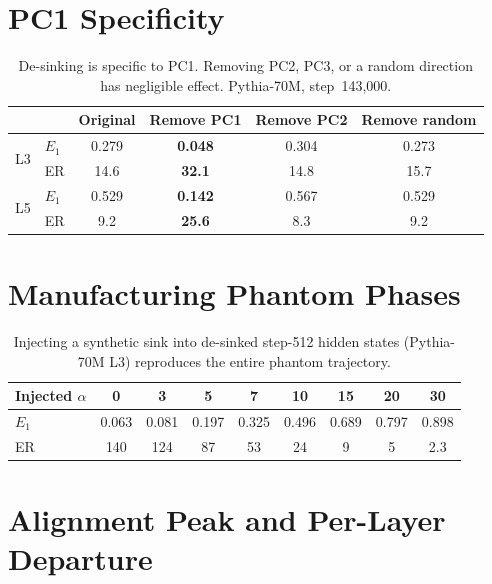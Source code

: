 \documentclass[11pt]{article}
\begin{document}
\section{PC1 Specificity}\label{app:specificity}

\begin{table}[h]
\centering
\caption{De-sinking is specific to PC1. Removing PC2, PC3, or a random direction has negligible effect. Pythia-70M, step~143{,}000.}
\small
\begin{tabular}{@{}llcccc@{}}
\toprule
& & \textbf{Original} & \textbf{Remove PC1} & \textbf{Remove PC2} & \textbf{Remove random} \\
\midrule
\multirow{2}{*}{L3} & $E_1$ & 0.279 & \textbf{0.048} & 0.304 & 0.273 \\
& ER & 14.6 & \textbf{32.1} & 14.8 & 15.7 \\
\midrule
\multirow{2}{*}{L5} & $E_1$ & 0.529 & \textbf{0.142} & 0.567 & 0.529 \\
& ER & 9.2 & \textbf{25.6} & 8.3 & 9.2 \\
\bottomrule
\end{tabular}
\end{table}

\section{Manufacturing Phantom Phases}\label{app:manufacture}

\begin{table}[h]
\centering
\caption{Injecting a synthetic sink into de-sinked step-512 hidden states (Pythia-70M L3) reproduces the entire phantom trajectory.}
\small
\begin{tabular}{@{}lcccccccc@{}}
\toprule
Injected $\alpha$ & 0 & 3 & 5 & 7 & 10 & 15 & 20 & 30 \\
\midrule
$E_1$ & 0.063 & 0.081 & 0.197 & 0.325 & 0.496 & 0.689 & 0.797 & 0.898 \\
ER & 140 & 124 & 87 & 53 & 24 & 9 & 5 & 2.3 \\
\bottomrule
\end{tabular}
\end{table}

\section{Alignment Peak and Per-Layer Departure}\label{app:inverted}
\end{document}
